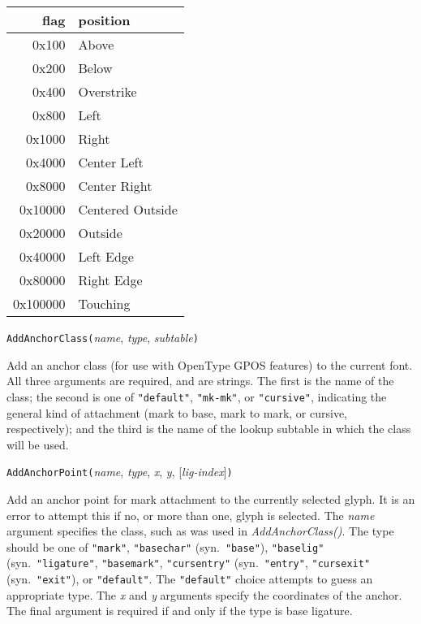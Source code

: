 \begin{tabular}{r|l}
  flag & position \\ \hline
  0x100 & Above \\
  0x200 & Below \\
  0x400 & Overstrike \\
  0x800 & Left \\
  0x1000 & Right \\
  0x4000 & Center Left \\
  0x8000 & Center Right \\
  0x10000 & Centered Outside \\ 
  0x20000 & Outside \\
  0x40000 & Left Edge \\
  0x80000 & Right Edge \\
  0x100000  & Touching
\end{tabular}



\texttt{AddAnchorClass(}\textit{name}, \textit{type},
  \textit{subtable}\texttt{)}

Add an anchor class (for use with OpenType GPOS features) to the current
font.  All three arguments are required, and are strings.  The first is the
name of the class; the second is one of \texttt{"default"},
\texttt{"mk-mk"}, or \texttt{"cursive"}, indicating the general kind of
attachment (mark to base, mark to mark, or cursive, respectively); and the
third is the name of the lookup subtable in which the class will be used.



\texttt{AddAnchorPoint(}\textit{name}, \textit{type}, \textit{x},
  \textit{y}, [\textit{lig-index}]\texttt{)}

Add an anchor point for mark attachment to the currently selected glyph. 
It is an error to attempt this if no, or more than one, glyph is selected. 
The \textit{name} argument specifies the class, such as was used in
\textit{AddAnchorClass()}.  The type should be one of \texttt{"mark"},
\texttt{"basechar"} (syn.\ \texttt{"base"}), \texttt{"baselig"} (syn.\
\texttt{"ligature"}, \texttt{"basemark"}, \texttt{"cursentry"} (syn.\
\texttt{"entry"}, \texttt{"cursexit"} (syn.\ \texttt{"exit"}), or
\texttt{"default"}.  The \texttt{"default"} choice attempts to guess an
appropriate type.  The \textit{x} and \textit{y} arguments specify the
coordinates of the anchor.  The final argument is required if and only if
the type is base ligature.

